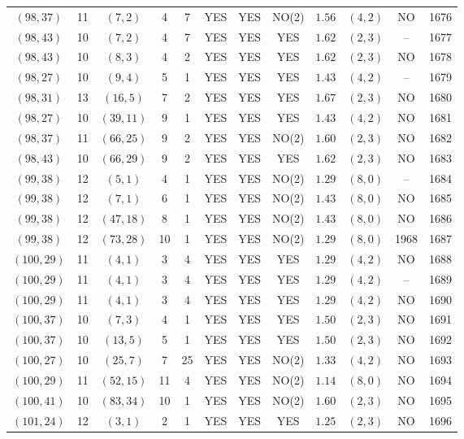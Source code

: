 \begin{longtable}{|c|c|c|c|c|c|c|c|c|c|c|c|}
$(98,37)$ & 11 & $(7,2)$ & 4 & 7 & YES & YES & NO(2) & $1.56$ & $(4,2)$ & NO & 1676\\
$(98,43)$ & 10 & $(7,2)$ & 4 & 7 & YES & YES & YES & $1.62$ & $(2,3)$ & -- & 1677\\
$(98,43)$ & 10 & $(8,3)$ & 4 & 2 & YES & YES & YES & $1.62$ & $(2,3)$ & NO & 1678\\
$(98,27)$ & 10 & $(9,4)$ & 5 & 1 & YES & YES & YES & $1.43$ & $(4,2)$ & -- & 1679\\
$(98,31)$ & 13 & $(16,5)$ & 7 & 2 & YES & YES & YES & $1.67$ & $(2,3)$ & NO & 1680\\
$(98,27)$ & 10 & $(39,11)$ & 9 & 1 & YES & YES & YES & $1.43$ & $(4,2)$ & NO & 1681\\
$(98,37)$ & 11 & $(66,25)$ & 9 & 2 & YES & YES & NO(2) & $1.60$ & $(2,3)$ & NO & 1682\\
$(98,43)$ & 10 & $(66,29)$ & 9 & 2 & YES & YES & YES & $1.62$ & $(2,3)$ & NO & 1683\\
$(99,38)$ & 12 & $(5,1)$ & 4 & 1 & YES & YES & NO(2) & $1.29$ & $(8,0)$ & -- & 1684\\
$(99,38)$ & 12 & $(7,1)$ & 6 & 1 & YES & YES & NO(2) & $1.43$ & $(8,0)$ & NO & 1685\\
$(99,38)$ & 12 & $(47,18)$ & 8 & 1 & YES & YES & NO(2) & $1.43$ & $(8,0)$ & NO & 1686\\
$(99,38)$ & 12 & $(73,28)$ & 10 & 1 & YES & YES & NO(2) & $1.29$ & $(8,0)$ & 1968 & 1687\\
$(100,29)$ & 11 & $(4,1)$ & 3 & 4 & YES & YES & YES & $1.29$ & $(4,2)$ & NO & 1688\\
$(100,29)$ & 11 & $(4,1)$ & 3 & 4 & YES & YES & YES & $1.29$ & $(4,2)$ & -- & 1689\\
$(100,29)$ & 11 & $(4,1)$ & 3 & 4 & YES & YES & YES & $1.29$ & $(4,2)$ & NO & 1690\\
$(100,37)$ & 10 & $(7,3)$ & 4 & 1 & YES & YES & YES & $1.50$ & $(2,3)$ & NO & 1691\\
$(100,37)$ & 10 & $(13,5)$ & 5 & 1 & YES & YES & YES & $1.50$ & $(2,3)$ & NO & 1692\\
$(100,27)$ & 10 & $(25,7)$ & 7 & 25 & YES & YES & NO(2) & $1.33$ & $(4,2)$ & NO & 1693\\
$(100,29)$ & 11 & $(52,15)$ & 11 & 4 & YES & YES & NO(2) & $1.14$ & $(8,0)$ & NO & 1694\\
$(100,41)$ & 10 & $(83,34)$ & 10 & 1 & YES & YES & NO(2) & $1.60$ & $(2,3)$ & NO & 1695\\
$(101,24)$ & 12 & $(3,1)$ & 2 & 1 & YES & YES & YES & $1.25$ & $(2,3)$ & NO & 1696\\

\end{longtable}
